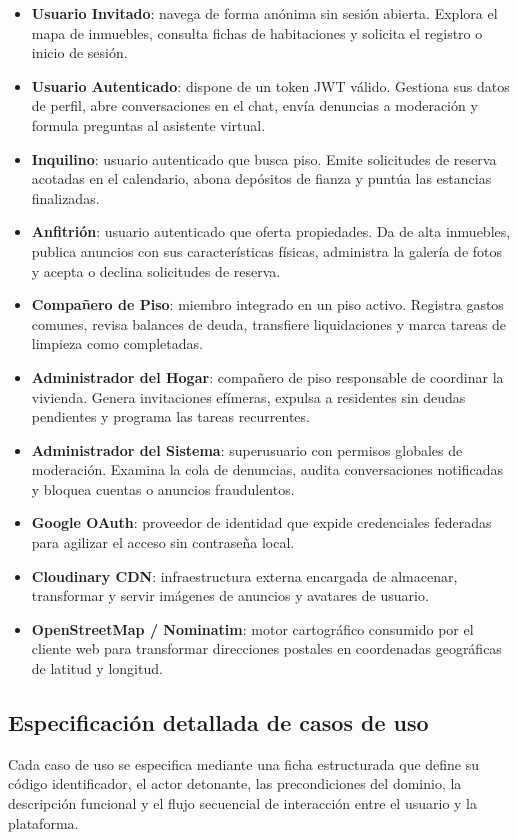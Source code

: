 \begin{itemize}
    \item \textbf{Usuario Invitado}: navega de forma anónima sin sesión abierta. Explora el mapa de inmuebles, consulta fichas de habitaciones y solicita el registro o inicio de sesión.
    \item \textbf{Usuario Autenticado}: dispone de un token JWT válido. Gestiona sus datos de perfil, abre conversaciones en el chat, envía denuncias a moderación y formula preguntas al asistente virtual.
    \item \textbf{Inquilino}: usuario autenticado que busca piso. Emite solicitudes de reserva acotadas en el calendario, abona depósitos de fianza y puntúa las estancias finalizadas.
    \item \textbf{Anfitrión}: usuario autenticado que oferta propiedades. Da de alta inmuebles, publica anuncios con sus características físicas, administra la galería de fotos y acepta o declina solicitudes de reserva.
    \item \textbf{Compañero de Piso}: miembro integrado en un piso activo. Registra gastos comunes, revisa balances de deuda, transfiere liquidaciones y marca tareas de limpieza como completadas.
    \item \textbf{Administrador del Hogar}: compañero de piso responsable de coordinar la vivienda. Genera invitaciones efímeras, expulsa a residentes sin deudas pendientes y programa las tareas recurrentes.
    \item \textbf{Administrador del Sistema}: superusuario con permisos globales de moderación. Examina la cola de denuncias, audita conversaciones notificadas y bloquea cuentas o anuncios fraudulentos.
    \item \textbf{Google OAuth}: proveedor de identidad que expide credenciales federadas para agilizar el acceso sin contraseña local.
    \item \textbf{Cloudinary CDN}: infraestructura externa encargada de almacenar, transformar y servir imágenes de anuncios y avatares de usuario.
    \item \textbf{OpenStreetMap / Nominatim}: motor cartográfico consumido por el cliente web para transformar direcciones postales en coordenadas geográficas de latitud y longitud.
\end{itemize}

\subsection{Especificación detallada de casos de uso}

    Cada caso de uso se especifica mediante una ficha estructurada que define su código identificador, el actor detonante, las precondiciones del dominio, la descripción funcional y el flujo secuencial de interacción entre el usuario y la plataforma.










